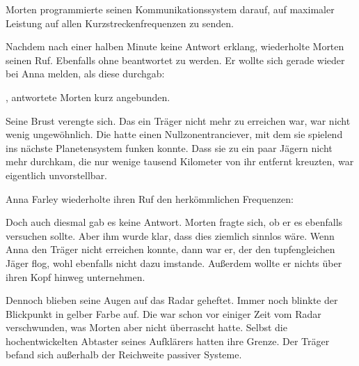\par

Morten programmierte seinen Kommunikationssystem darauf, auf maximaler Leistung auf allen Kurzstreckenfrequenzen zu senden. 

\par

Nachdem nach einer halben Minute keine Antwort erklang, wiederholte Morten seinen Ruf. Ebenfalls ohne beantwortet zu werden. Er wollte sich gerade wieder bei Anna melden, als diese durchgab: 

\par

, antwortete Morten kurz angebunden.

\par

Seine Brust verengte sich. Das ein Träger nicht mehr zu erreichen war, war nicht wenig ungewöhnlich. Die  hatte einen Nullzonentranciever, mit dem sie spielend ins nächste Planetensystem funken konnte. Dass sie zu ein paar Jägern nicht mehr durchkam, die nur wenige tausend Kilometer von ihr entfernt kreuzten, war eigentlich unvorstellbar.

\par

Anna Farley wiederholte ihren Ruf den herkömmlichen Frequenzen: 

\par

Doch auch diesmal gab es keine Antwort. Morten fragte sich, ob er es ebenfalls versuchen sollte. Aber ihm wurde klar, dass dies ziemlich sinnlos wäre. Wenn Anna den Träger nicht erreichen konnte, dann war er, der den tupfengleichen Jäger flog, wohl ebenfalls nicht dazu imstande. Außerdem wollte er nichts über ihren Kopf hinweg unternehmen.

\par

Dennoch blieben seine Augen auf das Radar geheftet. Immer noch blinkte der Blickpunkt in gelber Farbe auf. Die  war schon vor einiger Zeit vom Radar verschwunden, was Morten aber nicht überrascht hatte. Selbst die hochentwickelten Abtaster seines Aufklärers hatten ihre Grenze. Der Träger befand sich außerhalb der Reichweite passiver Systeme.

